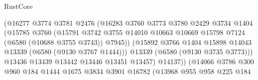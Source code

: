 \begin{lexlean}{RustCore}
\begin{coremodule}
                                      (@16277
                                        @3774
                                        @3781
                                        @2476
                                        (@16283
                                          @3760
                                          @3773
                                          @3780
                                          @2429
                                          @3734
                                          @1404
                                          (@15785
                                            @3760
                                            (@15791
                                              @3742
                                              @3755
                                              @14010
                                              @10663
                                              @10669
                                              @15798
                                              @7124
                                              (@6580 (@10688 @3755 @3743))
                                              @7945))
                                          (@15892
                                            @3766
                                            @1404
                                            @15898
                                            @14043
                                            @13339
                                            (@6580 (@9130 @3767 @1444)))
                                          @13339
                                          (@6580 (@9130 @3735 @3773)))
                                        @13436
                                        @13439
                                        @13442
                                        @13446
                                        @13451
                                        @13457)
                                      @14137))
                                  (@14066
                                    @3786
                                    @300
                                    @960
                                    @184
                                    @1444
                                    @1675
                                    @3834
                                    @3901
                                    @16782
                                    (@13968
                                      @955
                                      @958
                                      @225
                                      @184

\end{coremodule}
\end{lexlean}
